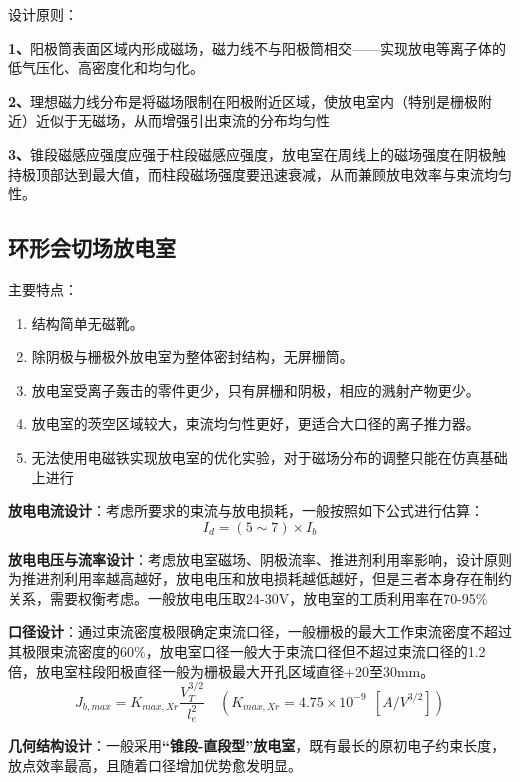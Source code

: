     设计原则：
    
    \textbf{1、}阳极筒表面区域内形成磁场，磁力线不与阳极筒相交——实现放电等离子体的低气压化、高密度化和均匀化。
    
    \textbf{2、}理想磁力线分布是将磁场限制在阳极附近区域，使放电室内（特别是栅极附近）近似于无磁场，从而增强引出束流的分布均匀性

    \textbf{3、}锥段磁感应强度应强于柱段磁感应强度，放电室在周线上的磁场强度在阴极触持极顶部达到最大值，而柱段磁场强度要迅速衰减，从而兼顾放电效率与束流均匀性。

  \subsection{环形会切场放电室}

    主要特点：
    \begin{enumerate}
      \item 结构简单无磁靴。
      \item 除阴极与栅极外放电室为整体密封结构，无屏栅筒。
      \item 放电室受离子轰击的零件更少，只有屏栅和阴极，相应的溅射产物更少。
      \item 放电室的茨空区域较大，束流均匀性更好，更适合大口径的离子推力器。
      \item 无法使用电磁铁实现放电室的优化实验，对于磁场分布的调整只能在仿真基础上进行
    \end{enumerate}

    \textbf{放电电流设计}：考虑所要求的束流与放电损耗，一般按照如下公式进行估算：
    \begin{equation}
      I_d = (5 \sim  7) \times I_b
    \end{equation}

    \textbf{放电电压与流率设计}：考虑放电室磁场、阴极流率、推进剂利用率影响，设计原则为推进剂利用率越高越好，放电电压和放电损耗越低越好，但是三者本身存在制约关系，需要权衡考虑。一般放电电压取24-30V，放电室的工质利用率在70-95\%

    \textbf{口径设计}：通过束流密度极限确定束流口径，一般栅极的最大工作束流密度不超过其极限束流密度的60\%，放电室口径一般大于束流口径但不超过束流口径的1.2倍，放电室柱段阳极直径一般为栅极最大开孔区域直径+20至30mm。
    \begin{equation}
      J_{b,max} = K_{max,Xr} \frac{V_T^{3/2}}{l_e^2} \quad \left( K_{max,Xr} = 4.75 \times 10^{-9} \ \ [A/V^{3/2}] \right)
    \end{equation}

    \textbf{几何结构设计}：一般采用\textbf{“锥段-直段型”放电室}，既有最长的原初电子约束长度，放点效率最高，且随着口径增加优势愈发明显。

